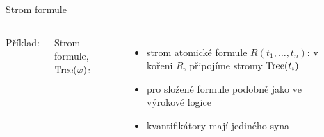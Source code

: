 \documentclass{beamer}
\begin{document}
\begin{frame}{Strom formule}

    \begin{columns}
        

        Příklad:  \pause 

        \bigskip

        \alert{Strom formule}, \alert{$\operatorname{Tree}(\varphi)$}: \pause 
        
        \begin{itemize}
            \item strom atomické formule $R(t_1,\dots,t_n)$: v kořeni $R$, připojíme stromy $\operatorname{Tree}(t_i)$ \pause 
            \item pro složené formule podobně jako ve výrokové logice \pause 
            \item kvantifikátory mají jediného syna \pause 
        \end{itemize}

        \vspace{1.5cm}


        \begin{center}
        \end{center}

    \end{columns}

\end{frame}
\end{document}
